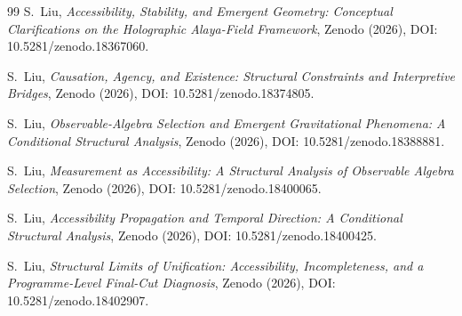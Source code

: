 \documentclass[12pt,a4paper,openany]{book}
\begin{document}
\begin{thebibliography}{99}
S.~Liu, \emph{Accessibility, Stability, and Emergent Geometry: Conceptual Clarifications on the Holographic Alaya-Field Framework}, Zenodo (2026), DOI: 10.5281/zenodo.18367060.

S.~Liu, \emph{Causation, Agency, and Existence: Structural Constraints and Interpretive Bridges}, Zenodo (2026), DOI: 10.5281/zenodo.18374805.

S.~Liu, \emph{Observable-Algebra Selection and Emergent Gravitational Phenomena: A Conditional Structural Analysis}, Zenodo (2026), DOI: 10.5281/zenodo.18388881.

S.~Liu, \emph{Measurement as Accessibility: A Structural Analysis of Observable Algebra Selection}, Zenodo (2026), DOI: 10.5281/zenodo.18400065.

S.~Liu, \emph{Accessibility Propagation and Temporal Direction: A Conditional Structural Analysis}, Zenodo (2026), DOI: 10.5281/zenodo.18400425.

S.~Liu, \emph{Structural Limits of Unification: Accessibility, Incompleteness, and a Programme-Level Final-Cut Diagnosis}, Zenodo (2026), DOI: 10.5281/zenodo.18402907.

\end{thebibliography}
\end{document}
